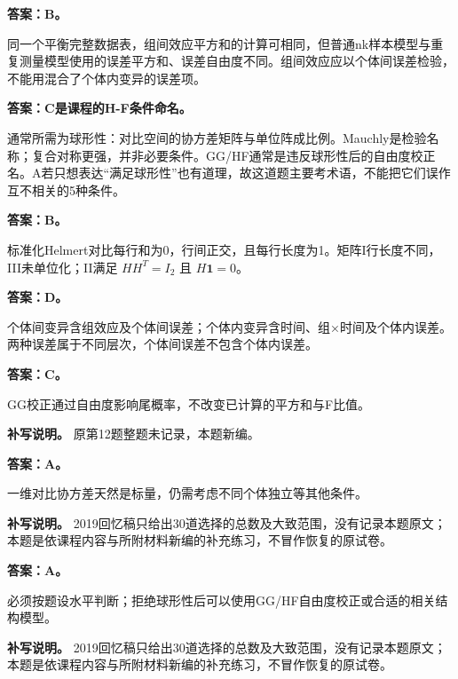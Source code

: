 
\textbf{答案：B。}

同一个平衡完整数据表，组间效应平方和的计算可相同，但普通nk样本模型与重复测量模型使用的误差平方和、误差自由度不同。组间效应应以个体间误差检验，不能用混合了个体内变异的误差项。



\textbf{答案：C是课程的H-F条件命名。}

通常所需为球形性：对比空间的协方差矩阵与单位阵成比例。Mauchly是检验名称；复合对称更强，并非必要条件。GG/HF通常是违反球形性后的自由度校正名。A若只想表达``满足球形性''也有道理，故这道题主要考术语，不能把它们误作互不相关的5种条件。



\textbf{答案：B。}

标准化Helmert对比每行和为0，行间正交，且每行长度为1。矩阵I行长度不同，III未单位化；II满足 \(HH^T=I_2\) 且 \(H\mathbf1=0\)。



\textbf{答案：D。}

个体间变异含组效应及个体间误差；个体内变异含时间、组×时间及个体内误差。两种误差属于不同层次，个体间误差不包含个体内误差。



\textbf{答案：C。}

GG校正通过自由度影响尾概率，不改变已计算的平方和与F比值。


\textbf{补写说明。} 原第12题整题未记录，本题新编。



\textbf{答案：A。}

一维对比协方差天然是标量，仍需考虑不同个体独立等其他条件。


\textbf{补写说明。} 2019回忆稿只给出30道选择的总数及大致范围，没有记录本题原文；本题是依课程内容与所附材料新编的补充练习，不冒作恢复的原试卷。



\textbf{答案：A。}

必须按题设水平判断；拒绝球形性后可以使用GG/HF自由度校正或合适的相关结构模型。


\textbf{补写说明。} 2019回忆稿只给出30道选择的总数及大致范围，没有记录本题原文；本题是依课程内容与所附材料新编的补充练习，不冒作恢复的原试卷。



